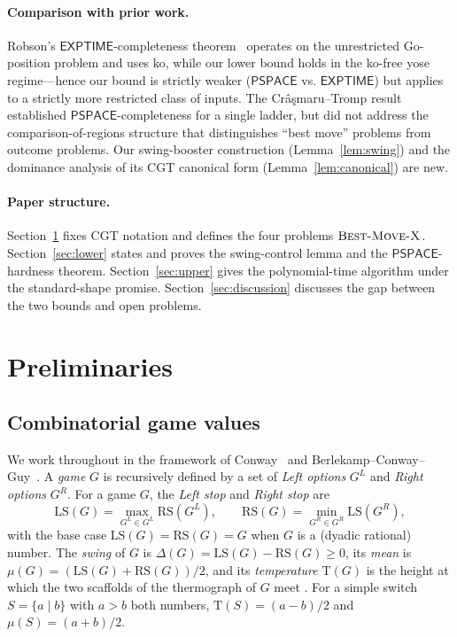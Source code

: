 \documentclass[11pt,a4paper]{amsart}
\theoremstyle{definition}
\theoremstyle{remark}
\newcommand{\LS}{\mathrm{LS}}
\newcommand{\RS}{\mathrm{RS}}
\newcommand{\Tt}{\mathrm{T}}
\newcommand{\PSPACE}{\mathsf{PSPACE}}
\newcommand{\BMX}{\textsc{Best-Move-X}}
\begin{document}
\paragraph{Comparison with prior work.}
Robson's $\mathsf{EXPTIME}$-completeness theorem~\cite{Robson1983}
operates on the unrestricted Go-position problem and uses ko, while our
lower bound holds in the ko-free yose regime---hence our bound is
strictly weaker ($\PSPACE$ vs. $\mathsf{EXPTIME}$) but applies to a
strictly more restricted class of inputs. The Cr\^{a}\c{s}maru--Tromp
result~\cite{CrasmaruTromp2000} established $\PSPACE$-completeness for a
single ladder, but did not address the comparison-of-regions structure
that distinguishes ``best move'' problems from outcome problems. Our
swing-booster construction (Lemma~\ref{lem:swing}) and the dominance
analysis of its CGT canonical form (Lemma~\ref{lem:canonical}) are new.

\paragraph{Paper structure.}
Section~\ref{sec:prelim} fixes CGT notation and defines the four
problems $\BMX$. Section~\ref{sec:lower} states and proves the swing-control
lemma and the $\PSPACE$-hardness theorem. Section~\ref{sec:upper}
gives the polynomial-time algorithm under the standard-shape promise.
Section~\ref{sec:discussion} discusses the gap between the two bounds and
open problems.

\section{Preliminaries}\label{sec:prelim}

\subsection{Combinatorial game values}

We work throughout in the framework of Conway~\cite{Conway1976} and
Berlekamp--Conway--Guy~\cite{BCG1982}. A \emph{game} $G$ is recursively
defined by a set of \emph{Left options} $G^L$ and \emph{Right options} $G^R$.
For a game $G$, the \emph{Left stop} and \emph{Right stop} are
\[
  \LS(G) = \max_{G^L \in G^L} \RS(G^L),
  \qquad
  \RS(G) = \min_{G^R \in G^R} \LS(G^R),
\]
with the base case $\LS(G) = \RS(G) = G$ when $G$ is a (dyadic rational)
number. The \emph{swing} of $G$ is $\Delta(G) = \LS(G) - \RS(G) \geq 0$,
its \emph{mean} is $\mu(G) = (\LS(G) + \RS(G))/2$, and its
\emph{temperature} $\Tt(G)$ is the height at which the two scaffolds of the
thermograph of $G$ meet \cite[Ch.~6]{BCG1982}. For a simple switch
$S = \{a \mid b\}$ with $a > b$ both numbers, $\Tt(S) = (a-b)/2$ and
$\mu(S) = (a+b)/2$.
\end{document}
